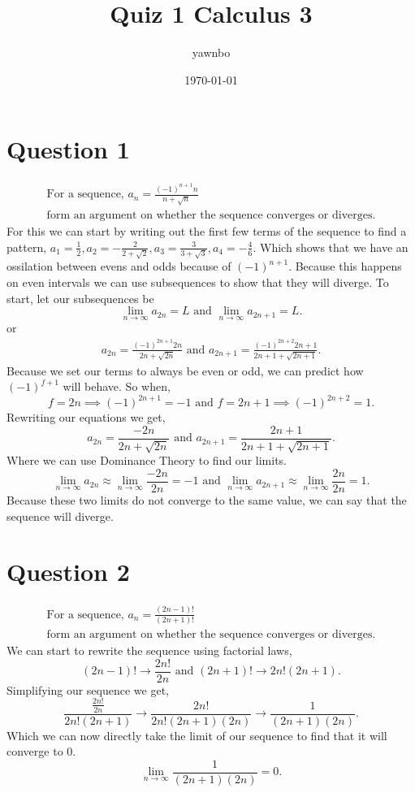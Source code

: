 \documentclass[a4paper]{article}
\title{Quiz 1 Calculus 3}
\author{yawnbo}
\date{\today}
\begin{document}
\section*{Question 1 }%
\label{sec:Question 1 }
\begin{gather*}
\text{ For a sequence, }a_n = \frac{ \left( -1 \right) ^{ n+1 }n }{ n+\sqrt{ n} } \\ 
\text{ form an argument on whether the sequence converges or diverges. }
\end{gather*}
For this we can start by writing out the first few terms of the sequence to find a pattern, $ a_1 = \frac{1}{2}, a_2 = -\frac{2}{2+\sqrt{ 2}}, a_3 = \frac{3}{3+\sqrt{ 3}}, a_4 = -\frac{4}{6}  $. Which shows that we have an ossilation between evens and odds because of $ \left( -1 \right) ^{ n+1 } $. Because this happens on even intervals we can use subsequences to show that they will diverge. 
To start, let our subsequences be
\[
\lim_{ n \to \infty} a_{ 2n } = L \text{ and } \lim_{ n \to \infty} a_{ 2n+1 }=L
.\] 
or
\begin{align*}
	a_{ 2n }=\frac{ \left( -1 \right) ^{ 2n+1 }2n }{ 2n+\sqrt{ 2n} } \text{ and } a_{ 2n+1 }=\frac{ \left( -1 \right) ^{ 2n+2 }2n+1 }{ 2n+1+\sqrt{ 2n+1} }
.\end{align*}
Because we set our terms to always be even or odd, we can predict how $ \left( -1 \right) ^{ f+1 } $ will behave. So when,
\[
f=2n \implies \left( -1 \right) ^{ 2n+1 }=-1 \text{ and } f=2n+1 \implies \left( -1 \right) ^{ 2n+2 }=1
.\]
Rewriting our equations we get,
\[
a_{ 2n }=\frac{ -2n }{ 2n+\sqrt{ 2n} } \text{ and } a_{ 2n+1 }=\frac{ 2n+1 }{ 2n+1+\sqrt{ 2n+1} }
.\] 
Where we can use Dominance Theory to find our limits.
\[
\lim_{ n \to \infty} a_{ 2n }\approx \lim_{ n \to \infty} \frac{ -2n }{ 2n }=-1 \text{ and } \lim_{ n \to \infty} a_{ 2n+1 }\approx \lim_{ n \to \infty} \frac{ 2n }{ 2n }=1
.\] 
Because these two limits do not converge to the same value, we can say that the sequence will diverge.

\newpage
\section*{Question 2}%
\label{sec:Question 2}

\begin{gather*}
\text{ For a sequence, }a_n = \frac{ \left( 2n-1 \right) ! }{ \left( 2n+1 \right) ! }\\ 
\text{ form an argument on whether the sequence converges or diverges. }
\end{gather*}
We can start to rewrite the sequence using factorial laws,
\[
	\left( 2n-1 \right) ! \to \frac{ 2n! }{ 2n } \text{ and } \left( 2n+1 \right) ! \to 2n!\left( 2n+1 \right) 
.\] 
Simplifying our sequence we get,
\[
\frac{ \frac{ 2n! }{ 2n } }{ 2n!\left( 2n+1 \right)  }\to \frac{ 2n! }{ 2n!\left( 2n+1 \right) \left( 2n \right)  }\to \frac{1}{\left( 2n+1 \right) \left( 2n \right) }
.\] 
Which we can now directly take the limit of our sequence to find that it will converge to 0.
\[
\lim_{ n \to \infty} \frac{1}{\left( 2n+1 \right) \left( 2n \right) }= 0
.\] 

\end{document}
